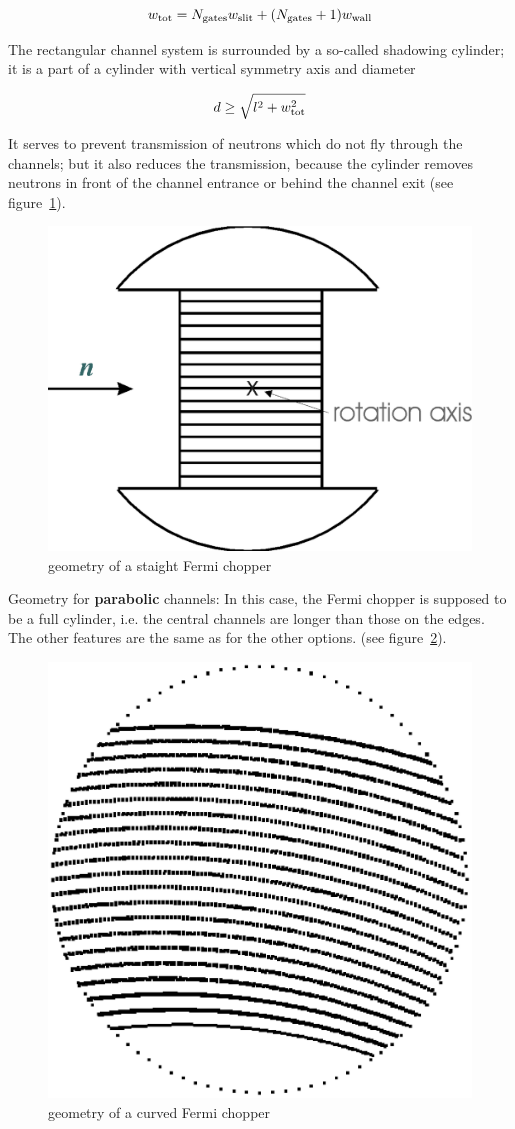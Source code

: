 \begin{equation}
w_{\rm tot} = N_{\rm gates} w_{\rm slit} + (N_{\rm gates}+1) w_{\rm wall}
\end{equation}

The rectangular channel system is surrounded by a so-called shadowing cylinder; it is a
part of a cylinder with vertical symmetry axis and diameter

\begin{equation}
d \geq \sqrt{l^2 + w_{\rm tot}^2}
\end{equation}

It serves to prevent transmission of neutrons which do not fly through the channels;
but it also reduces the transmission, because the cylinder removes neutrons
in front of the channel entrance or behind the channel exit (see figure~\ref{f:vit_fc1}).

\begin{figure}[ht]
\begin{center}
\includegraphics[width=0.45\linewidth]{figures/vitess_fc_str.eps}
\caption{geometry of a staight Fermi chopper\label{f:vit_fc1}}
\end{center}
\end{figure}

Geometry for {\bf parabolic} channels:
In this case, the Fermi chopper is supposed to be a full cylinder, i.e. the central
channels are longer than those on the edges. The other features are the same as for
the other options. (see figure~\ref{f:vit_fc2}).

\begin{figure}[ht]
\begin{center}
\includegraphics[width=0.4\linewidth]{figures/vitess_fc_parab.eps}
\caption{geometry of a curved Fermi chopper\label{f:vit_fc2}}
\end{center}
\end{figure}

